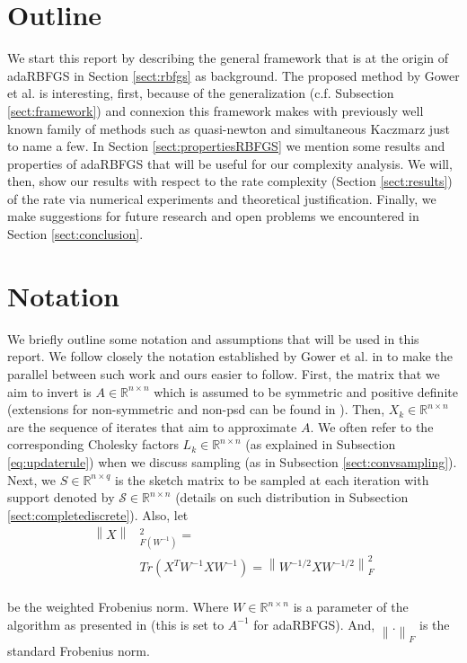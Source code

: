 \documentclass[12pt,conference,compsocconf]{IEEEtran}
\newcommand\norm[1]{\left\lVert#1\right\rVert}
\newcommand{\R}{\mathbb{R}}
\begin{document}
\section{Outline}
We start this report by describing the general framework that is at the origin of adaRBFGS in Section \ref{sect:rbfgs} as background. The proposed method by Gower et al. is interesting, first, because of the generalization (c.f. Subsection \ref{sect:framework}) and connexion this framework makes with previously well known family of methods such as quasi-newton and simultaneous Kaczmarz just to name a few. In Section \ref{sect:propertiesRBFGS} we mention some results and properties of adaRBFGS that will be useful for our complexity analysis. We will, then, show our results with respect to the rate complexity (Section \ref{sect:results}) of the rate via numerical experiments and theoretical justification. Finally, we make suggestions for future research and open problems we encountered in Section \ref{sect:conclusion}.


\section{Notation}\label{sect:notation}
We briefly outline some notation and assumptions that will be used in this report. We follow closely the notation established by Gower et al. in \cite{Gower1} to make the parallel between such work and ours easier to follow. First, the matrix that we aim to invert is $A \in \R^{n\times n}$ which is assumed to be symmetric and positive definite (extensions for non-symmetric and non-psd can be found in \cite{Gower1,Gower4}). Then, $X_k \in \R^{n\times n}$ are the sequence of iterates that aim to approximate $A$. We often refer to the corresponding Cholesky factors $L_k \in \R^{n\times n}$ (as explained in Subsection \ref{eq:updaterule}) when we discuss sampling (as in Subsection \ref{sect:convsampling}). Next, we $S \in \R^{n\times q}$ is the sketch matrix to be sampled at each iteration with support denoted by $\mathcal{S} \in \R^{n \times n}$ (details on such distribution in Subsection \ref{sect:completediscrete}). Also, let\\
\begin{align} \label{eq:norm}
	\norm{X}&_{F(W^{-1})}^2 =\\ \nonumber
    &Tr(X^TW^{-1}XW^{-1})=\norm{W^{-1/2}XW^{-1/2}}_F^2\\ \nonumber
\end{align}

be the weighted Frobenius norm. Where $W \in \R^{n \times n}$ is a parameter of the algorithm as presented in \cite{Gower1} (this is set to $A^{-1}$ for adaRBFGS). And, $\norm{.}_F$ is the standard Frobenius norm.
\end{document}
